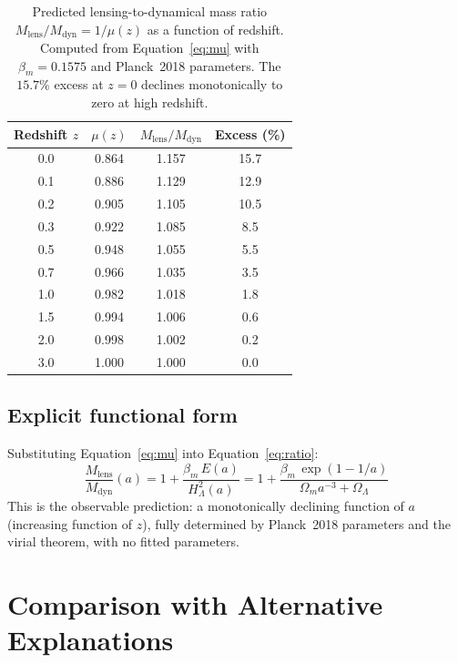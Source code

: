 \documentclass[12pt,a4paper]{article}
\begin{document}
\begin{table}[h]
\centering
\caption{Predicted lensing-to-dynamical mass ratio $M_\mathrm{lens}/M_\mathrm{dyn}
= 1/\mu(z)$ as a function of redshift. Computed from Equation~\ref{eq:mu} with
$\beta_m = 0.1575$ and Planck~2018 parameters. The $15.7\%$ excess at $z=0$
declines monotonically to zero at high redshift.}
\label{tab:ratio}
\begin{tabular}{cccc}
\toprule
Redshift $z$ & $\mu(z)$ & $M_\mathrm{lens}/M_\mathrm{dyn}$ & Excess (\%) \\
\midrule
0.0 & 0.864 & 1.157 & 15.7 \\
0.1 & 0.886 & 1.129 & 12.9 \\
0.2 & 0.905 & 1.105 & 10.5 \\
0.3 & 0.922 & 1.085 &  8.5 \\
0.5 & 0.948 & 1.055 &  5.5 \\
0.7 & 0.966 & 1.035 &  3.5 \\
1.0 & 0.982 & 1.018 &  1.8 \\
1.5 & 0.994 & 1.006 &  0.6 \\
2.0 & 0.998 & 1.002 &  0.2 \\
3.0 & 1.000 & 1.000 &  0.0 \\
\bottomrule
\end{tabular}
\end{table}

\subsection{Explicit functional form}

Substituting Equation~\ref{eq:mu} into Equation~\ref{eq:ratio}:
\begin{equation}
\frac{M_\mathrm{lens}}{M_\mathrm{dyn}}(a)
= 1 + \frac{\beta_m\, E(a)}{H^2_\Lambda(a)}
= 1 + \frac{\beta_m\, \exp(1-1/a)}{\Omega_m a^{-3} + \Omega_\Lambda}
\label{eq:ratio_explicit}
\end{equation}
This is the observable prediction: a monotonically declining function of $a$
(increasing function of $z$), fully determined by Planck~2018 parameters and the
virial theorem, with no fitted parameters.

\section{Comparison with Alternative Explanations}
\end{document}
